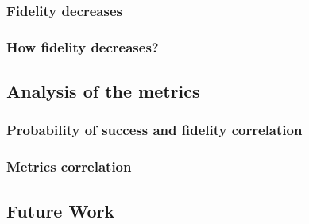 \documentclass[11pt]{article}
\begin{document}
\subsubsection{Fidelity decreases}
\label{sec:org21f5871}
\subsubsection{How fidelity decreases?}
\label{sec:org0a7e0f2}
\subsection{Analysis of the metrics}
\label{sec:org07623f2}
\subsubsection{Probability of success and fidelity correlation}
\label{sec:orge9f158a}
\subsubsection{Metrics correlation}
\label{sec:orgee19340}
\subsection{Future Work}
\label{sec:org17c2287}
\end{document}
